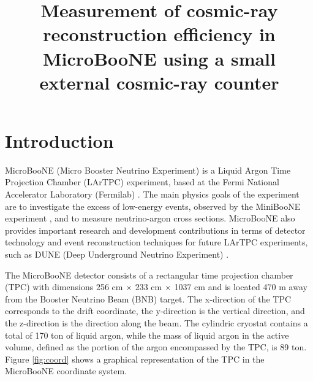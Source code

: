 \documentclass[a4paper,11pt]{article}
\title{\boldmath Measurement of cosmic-ray reconstruction efficiency in MicroBooNE using a small external cosmic-ray counter}
\begin{document}
\maketitle
\flushbottom

\section{Introduction}
\label{sec:intro}
MicroBooNE (Micro Booster Neutrino Experiment) is a Liquid Argon Time Projection Chamber (LArTPC) experiment, based at the Fermi National Accelerator Laboratory (Fermilab) \cite{detector}. The main physics goals of the experiment are to investigate the excess of low-energy events, observed by the MiniBooNE experiment \cite{miniboone}, and to measure neutrino-argon cross sections. MicroBooNE also provides important research and development contributions in terms of detector technology and event reconstruction techniques for future LArTPC experiments, such as DUNE (Deep Underground Neutrino Experiment) \cite{dune}.

The MicroBooNE detector  consists of a rectangular time projection chamber (TPC) with dimensions 256 cm $\times$ 233 cm $\times$ 1037 cm and is located 470 m away from the Booster Neutrino Beam (BNB) target. The x-direction of the TPC corresponds to the drift coordinate, the y-direction is the vertical direction, and the z-direction is the direction along the beam. The cylindric cryostat contains a total of 170 ton of liquid argon, while the mass of liquid argon in the active volume, defined as the portion of the argon encompassed by the TPC, is 89 ton. Figure \ref{fig:coord} shows a graphical representation of the TPC in the MicroBooNE coordinate system.
\end{document}
